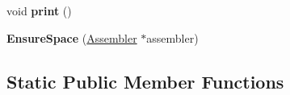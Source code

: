 \begin{DoxyCompactItemize}
\item 
void {\bfseries print} ()\hypertarget{classv8_1_1internal_1_1_b_a_s_e___e_m_b_e_d_d_e_d_a8f853500e030e067ad6f371840c587dc}{}\label{classv8_1_1internal_1_1_b_a_s_e___e_m_b_e_d_d_e_d_a8f853500e030e067ad6f371840c587dc}

\item 
{\bfseries Ensure\+Space} (\hyperlink{classv8_1_1internal_1_1_assembler}{Assembler} $\ast$assembler)\hypertarget{classv8_1_1internal_1_1_b_a_s_e___e_m_b_e_d_d_e_d_a1783ae45958467ea414d65905637641f}{}\label{classv8_1_1internal_1_1_b_a_s_e___e_m_b_e_d_d_e_d_a1783ae45958467ea414d65905637641f}

\end{DoxyCompactItemize}
\subsection*{Static Public Member Functions}
